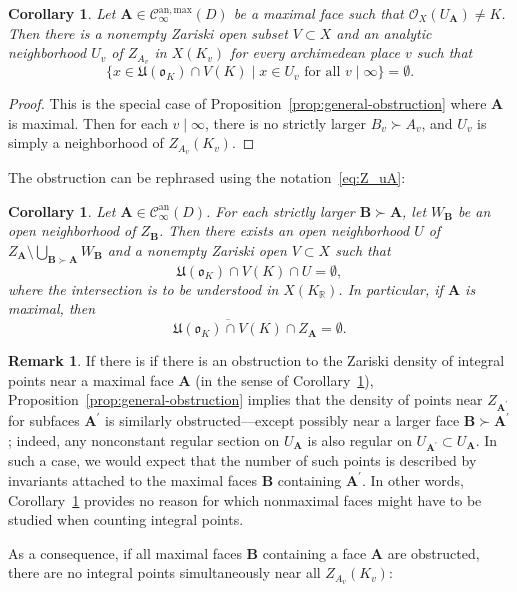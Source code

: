 \documentclass[a4paper, twoside, 10pt]{amsart}
\newcommand{\uA}{{\boldsymbol{A}}}
\newcommand{\uB}{{\boldsymbol{B}}}
\newcommand{\cC}{\mathcal{C}}
\newcommand{\cO}{\mathcal{O}}
\newcommand{\mU}{\mathfrak{U}}
\newcommand{\fo}{\mathfrak{o}}
\newcommand{\RR}{\mathbb{R}}
\newcommand{\Can}{\cC^{\mathrm{an}}}
\newcommand{\Canmax}{\cC^{\mathrm{an,max}}}
\newtheorem{corollary}[theorem]{Corollary}
\theoremstyle{definition}
\newtheorem{remark}[theorem]{Remark}
\begin{document}
\begin{corollary}\label{cor:obstruction}
  Let $\uA\in\Canmax_\infty(D)$ be a maximal face such that $\cO_X(U_\uA)\ne K$. Then there is a nonempty Zariski open subset $V\subset X$ and an analytic neighborhood $U_v$ of $Z_{A_v}$ in $X(K_v)$ for every archimedean place $v$ such that
  \[
    \{x\in \mU(\fo_K) \cap V(K) \mid x\in U_v \text{ for all } v\mid\infty\} = \emptyset.
  \]
\end{corollary}
\begin{proof}
  This is the special case of Proposition~\ref{prop:general-obstruction} where $\uA$ is maximal. Then for each $v\mid\infty$, there is no strictly larger $B_v\succ A_v$, and $U_v$ is simply a neighborhood of $Z_{A_v}(K_v)$.
\end{proof}

The obstruction can be rephrased using the notation~\eqref{eq:Z_uA}:

\begin{corollary}\label{cor:obstruction-adelic}
  Let $\uA\in\Can_\infty(D)$. For each strictly larger $\uB \succ \uA$, let $W_\uB$ be an open neighborhood of $Z_\uB$. Then there exists an open neighborhood $U$ of $Z_\uA \setminus \bigcup_{\uB\succ \uA} W_\uB$ and a nonempty Zariski open $V\subset X$ such that
  \[
    \mU(\fo_K) \cap V(K) \cap U = \emptyset,
  \]
  where the intersection is to be understood in $X(K_\RR)$.
  In particular, if $\uA$ is maximal, then
  \[
    \overline{\mU(\fo_K) \cap V(K)} \cap Z_{\uA} =\emptyset. 
  \]
\end{corollary}

\begin{remark}\label{rem:nonmaximal}
  If there is if there is an obstruction to the Zariski density of integral points near a maximal face $\uA$ (in the sense of Corollary~\ref{cor:obstruction}), Proposition~\ref{prop:general-obstruction} implies that the density of points near $Z_{\uA^\prime}$ for subfaces $\uA^\prime$ is similarly obstructed---except possibly near a larger face $\uB \succ \uA^\prime$; indeed, any nonconstant regular section on $U_\uA$ is also regular on $U_{\uA^\prime}\subset U_\uA$.
  In such a case, we would expect that the number of such points is described by invariants attached to the maximal faces $\uB$ containing $\uA^\prime$. In other words, Corollary~\ref{cor:obstruction} provides no reason for which nonmaximal faces might have to be studied when counting integral points. 
\end{remark}

As a consequence, if all maximal faces $\uB$ containing a face $\uA$ are obstructed, there are no integral points simultaneously near all $Z_{A_v}(K_v)$:
\end{document}
